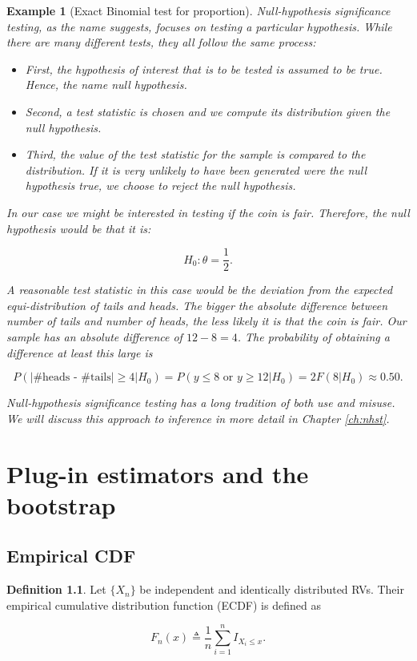 \documentclass{book}
\theoremstyle{plain}%
\newtheorem{prototheorem}{Example}[section]
\newenvironment{cexample}
   {\colorlet{shadecolor}{gray!10}\begin{shaded}\begin{prototheorem}}
   {\end{prototheorem}\end{shaded}}
\theoremstyle{definition}
\newtheorem{definition}{Definition}[section]
\begin{document}
\begin{cexample}[Exact Binomial test for proportion] Null-hypothesis significance testing, as the name suggests, focuses on testing a particular hypothesis. While there are many different tests, they all follow the same process:

\begin{itemize}
\item First, the hypothesis of interest that is to be tested is assumed to be true. Hence, the name \emph{null hypothesis}.
\item Second, a test statistic is chosen and we compute its distribution given the null hypothesis.
\item Third, the value of the test statistic for the sample is compared to the distribution. If it is very unlikely to have been generated were the null hypothesis true, we choose to reject the null hypothesis.
\end{itemize}

In our case we might be interested in testing if the coin is fair. Therefore, the null hypothesis would be that it is:

$$H_0: \theta = \frac{1}{2}.$$

A reasonable test statistic in this case would be the deviation from the expected equi-distribution of tails and heads. The bigger the absolute difference between number of tails and number of heads, the less likely it is that the coin is fair. Our sample has an absolute difference of $12 - 8 = 4$. The probability of obtaining a difference at least this large is 

$$P(|\text{\#heads - \#tails}| \geq 4| H_0)  = P(y \leq 8 \text{ or } y \geq 12| H_0) = 2F(8|H_0) \approx 0.50.$$

Null-hypothesis significance testing has a long tradition of both use and misuse. We will discuss this approach to inference in more detail in Chapter \ref{ch:nhst}.
\end{cexample}



\chapter{Plug-in estimators and the bootstrap}

\section{Empirical CDF}

\begin{definition} Let $\{X_n\}$ be independent and identically distributed RVs. Their empirical cumulative distribution function (ECDF) is defined as

$$F_n(x) \triangleq \frac{1}{n}\sum_{i=1}^n I_{X_i \leq x}.$$
\end{definition}
\end{document}
